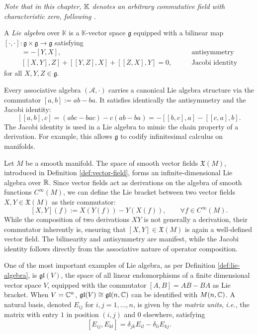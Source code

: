 \noindent \textit{Note that in this chapter, $\mathbb{K}$ denotes an arbitrary commutative field with characteristic zero, following \cite{humphreysIntroductionLieAlgebras2010}.}

\begin{definition}\label{def:lie-algebra}
	A \emph{Lie algebra} over $\mathbb{K}$ is a $\mathbb{K}$-vector space $\mathfrak{g}$ equipped with a bilinear map $[\cdot,\cdot]:\mathfrak{g}\times\mathfrak{g}\to\mathfrak{g}$ satisfying
	\begin{align}
	[X,Y] = -[Y,X], \qquad &\text{antisymmetry} \\
	[[X,Y],Z]+[[Y,Z],X]+[[Z,X],Y]=0, \qquad &\text{Jacobi identity}
	\end{align}
	for all $X,Y,Z\in\mathfrak{g}$. 
\end{definition}

\begin{remark}
	Every associative algebra $(\mathcal{A},\cdot)$ carries a canonical Lie algebra
	structure via the commutator $[a,b]:=ab-ba$. It satisfies identically the antisymmetry and the Jacobi identity:
	\[
		[[a,b],c] = (abc - bac) - c(ab - ba) = -[[b,c],a] - [[c,a],b].
	\]
	The Jacobi identity is used in a Lie algebra to mimic the chain property of a derivation. For example, this allows $\mathfrak{g}$ to codify infinitesimal calculus on manifolds.
\end{remark}

\begin{example}\label{ex:lie-fields}
	Let $M$ be a smooth manifold. The space of smooth vector fields $\mathfrak{X}(M)$, introduced in Definition \ref{def:vector-field}, forms an infinite-dimensional Lie algebra over $\mathbb{R}$. Since vector fields act as derivations on the algebra of smooth functions $C^\infty(M)$, we can define the Lie bracket between two vector fields $X, Y \in \mathfrak{X}(M)$ as their commutator:
	\[
	[X, Y](f) := X(Y(f)) - Y(X(f)), \qquad \forall f \in C^\infty(M).
	\]
	While the composition of two derivations $XY$ is not generally a derivation, their commutator inherently is, ensuring that $[X,Y] \in \mathfrak{X}(M)$ is again a well-defined vector field. The bilinearity and antisymmetry are manifest, while the Jacobi identity follows directly from the associative nature of operator composition.
\end{example}

\begin{example}
	One of the most important examples of Lie algebra, as per Definition \ref{def:lie-algebra}, is $\mathfrak{gl}(V)$, the space of all linear endomorphisms of a finite dimensional vector space $V$, equipped with the commutator $[A,B] = AB - BA$ as Lie bracket. When $V = \mathbb{C}^n$, $\mathfrak{gl}(V) \cong \mathfrak{gl}(n,\mathbb{C})$ can be identified with $M(n,\mathbb{C})$. A natural basis, denoted $E_{ij}$ for $i,j = 1,\dots,n$, is given by the \textit{matrix units}, \textit{i.e.}, the matrix with entry $1$ in position $(i,j)$ and $0$ elsewhere, satisfying $$[E_{ij}, E_{kl}] = \delta_{jk}E_{il} - \delta_{li}E_{kj}.$$
\end{example}

